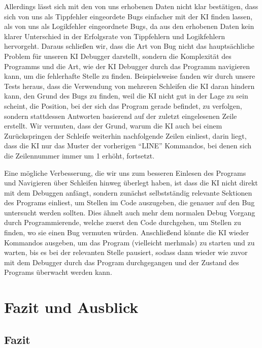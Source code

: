 \documentclass[a4paper,12pt,ngerman]{scrartcl}
\begin{document}
Allerdings lässt sich mit den von uns erhobenen Daten nicht klar bestätigen, dass sich von uns als Tippfehler eingeordete Bugs einfacher mit der KI finden lassen, als von uns als Logikfehler eingeordnete Bugs, da aus den erhobenen Daten kein klarer Unterschied in der Erfolgsrate von Tippfehlern und Logikfehlern hervorgeht. Daraus schließen wir, dass die Art von Bug nicht das hauptsächliche Problem für unseren KI Debugger darstellt, sondern die Komplexität des Programms und die Art, wie der KI Debugger durch das Programm navigieren kann, um die fehlerhafte Stelle zu finden. Beispielsweise fanden wir durch unsere Tests heraus, dass die Verwendung von mehreren Schleifen die KI daran hindern kann, den Grund des Bugs zu finden, weil die KI nicht gut in der Lage zu sein scheint, die Position, bei der sich das Program gerade befindet, zu verfolgen, sondern stattdessen Antworten basierend auf der zuletzt eingelesenen Zeile erstellt. Wir vermuten, dass der Grund, warum die KI auch bei einem Zurückspringen der Schleife weiterhin nachfolgende Zeilen einliest, darin liegt, dass die KI nur das Muster der vorherigen ``LINE'' Kommandos, bei denen sich die Zeilennummer immer um 1 erhöht, fortsetzt.

Eine mögliche Verbesserung, die wir uns zum besseren Einlesen des Programs und Navigieren über Schleifen hinweg überlegt haben, ist dass die KI nicht direkt mit dem Debuggen anfängt, sondern zunächst selbstständig relevante Sektionen des Programs einliest, um Stellen im Code auszugeben, die genauer auf den Bug untersucht werden sollten. Dies ähnelt auch mehr dem normalen Debug Vorgang durch Programmierende, welche zuerst den Code durchgehen, um Stellen zu finden, wo sie einen Bug vermuten würden. Anschließend könnte die KI wieder Kommandos ausgeben, um das Program (vielleicht merhmals) zu starten und zu warten, bis es bei der relevanten Stelle pausiert, sodass dann wieder wie zuvor mit dem Debugger durch das Program durchgegangen und der Zustand des Programs überwacht werden kann.

\section{Fazit und Ausblick}

\subsection{Fazit}
\end{document}
